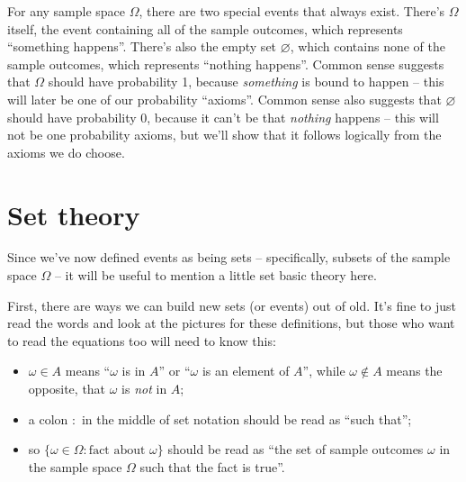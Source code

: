 \documentclass[
  a4paper,
]{book}
\providecommand{\tightlist}{%
  \setlength{\itemsep}{0pt}\setlength{\parskip}{0pt}}
\theoremstyle{definition}
\theoremstyle{definition}
\theoremstyle{definition}
\theoremstyle{definition}
\theoremstyle{remark}
\begin{document}
For any sample space \(\Omega\), there are two special events that always exist. There's \(\Omega\) itself, the event containing all of the sample outcomes, which represents ``something happens''. There's also the empty set \(\varnothing\), which contains none of the sample outcomes, which represents ``nothing happens''. Common sense suggests that \(\Omega\) should have probability 1, because \emph{something} is bound to happen -- this will later be one of our probability ``axioms''. Common sense also suggests that \(\varnothing\) should have probability 0, because it can't be that \emph{nothing} happens -- this will not be one probability axioms, but we'll show that it follows logically from the axioms we do choose.

\hypertarget{set-theory}{%
\section{Set theory}\label{set-theory}}

Since we've now defined events as being sets -- specifically, subsets of the sample space \(\Omega\) -- it will be useful to mention a little set basic theory here.

First, there are ways we can build new sets (or events) out of old. It's fine to just read the words and look at the pictures for these definitions, but those who want to read the equations too will need to know this:

\begin{itemize}
\tightlist
\item
  \(\omega \in A\) means ``\(\omega\) is in \(A\)'' or ``\(\omega\) is an element of \(A\)'', while \(\omega \not\in A\) means the opposite, that \(\omega\) is \emph{not} in \(A\);
\item
  a colon \(:\) in the middle of set notation should be read as ``such that'';
\item
  so \(\{\omega \in \Omega : \text{fact about $\omega$}\}\) should be read as ``the set of sample outcomes \(\omega\) in the sample space \(\Omega\) such that the fact is true''.
\end{itemize}
\end{document}
